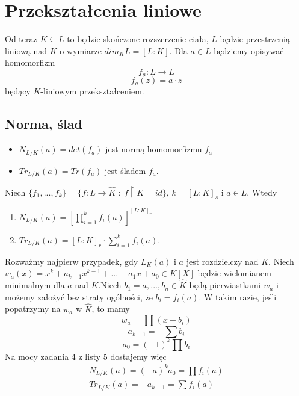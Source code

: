 \section{Przekształcenia liniowe}

Od teraz $K\subseteq L$ to będzie skończone rozszerzenie ciała, $L$ będzie przestrzenią liniową nad $K$ o wymiarze $dim_KL=[L:K]$. Dla $a\in L$ będziemy opisywać homomorfizm
$$f_a:L\to L$$
$$f_a(z)=a\cdot z$$
będący $K$-liniowym przekształceniem.

\subsection{Norma, ślad}

\begin{bbox}
\begin{itemize}
    \item[\PHtunny] $N_{L/K}(a)=det(f_a)$ jest normą homomorfizmu $f_a$
    \item[\PHtunny] $Tr_{L/K}(a)=Tr(f_a)$ jest śladem $f_a$.
\end{itemize}
\end{bbox}

\begin{fact}
Niech $\{f_1,...,f_k \}=\{f:L\to \hat{K}\;:\;f\restriction K=id\}$, $k=[L:K]_s$ i $a\in L$. Wtedy
\begin{enumerate}
    \item $N_{L/K}(a)=\left[\prod\limits_{i=1}^kf_i(a)\right]^{[L:K]_r}$
    \item $Tr_{L/K}(a)=[L:K]_r\cdot\sum\limits_{i=1}^kf_i(a)$.
\end{enumerate}
\end{fact}
    Rozważmy najpierw przypadek, gdy $L_K(a)$ i $a$ jest rozdzielczy nad $K$. Niech $w_a(x)=x^k+a_{k-1}x^{k-1}+...+a_1x+a_0\in K[X]$ będzie wielomianem minimalnym dla $a$ nad $K$.Niech $b_1=a,...,b_n\in\hat{K}$ będą pierwiastkami $w_a$ i możemy założyć bez straty ogólności, że $b_i=f_i(a)$. W takim razie, jeśli popatrzymy na $w_a$ w $\hat{K}$, to mamy
    $$w_a=\prod(x-b_i)$$
    $$a_{k-1}=-\sum b_i$$
    $$a_0=(-1)^k\prod b_i$$
    Na mocy zadania 4 z listy 5 dostajemy więc
    $$\begin{array}{l}
        N_{L/K}(a)=(-a)^ka_0=\prod f_i(a)\\
        Tr_{L/K}(a)=-a_{k-1}=\sum f_i(a)
    \end{array}$$

